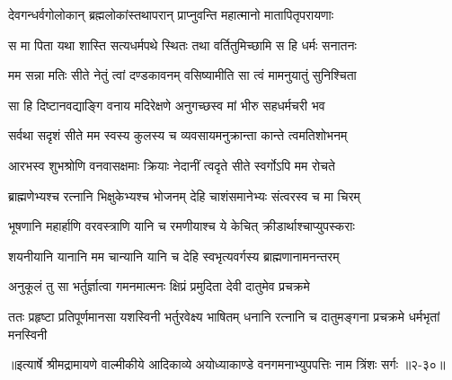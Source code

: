 \twolineshloka
{देवगन्धर्वगोलोकान् ब्रह्मलोकांस्तथापरान्}
{प्राप्नुवन्ति महात्मानो मातापितृपरायणाः} %

\twolineshloka
{स मा पिता यथा शास्ति सत्यधर्मपथे स्थितः}
{तथा वर्तितुमिच्छामि स हि धर्मः सनातनः} %

\twolineshloka
{मम सन्ना मतिः सीते नेतुं त्वां दण्डकावनम्}
{वसिष्यामीति सा त्वं मामनुयातुं सुनिश्चिता} %

\twolineshloka
{सा हि दिष्टानवद्याङ्गि वनाय मदिरेक्षणे}
{अनुगच्छस्व मां भीरु सहधर्मचरी भव} %

\twolineshloka
{सर्वथा सदृशं सीते मम स्वस्य कुलस्य च}
{व्यवसायमनुक्रान्ता कान्ते त्वमतिशोभनम्} %

\twolineshloka
{आरभस्व शुभश्रोणि वनवासक्षमाः क्रियाः}
{नेदानीं त्वदृते सीते स्वर्गोऽपि मम रोचते} %

\twolineshloka
{ब्राह्मणेभ्यश्च रत्नानि भिक्षुकेभ्यश्च भोजनम्}
{देहि चाशंसमानेभ्यः संत्वरस्व च मा चिरम्} %

\twolineshloka
{भूषणानि महार्हाणि वरवस्त्राणि यानि च}
{रमणीयाश्च ये केचित् क्रीडार्थाश्चाप्युपस्कराः} %

\twolineshloka
{शयनीयानि यानानि मम चान्यानि यानि च}
{देहि स्वभृत्यवर्गस्य ब्राह्मणानामनन्तरम्} %

\twolineshloka
{अनुकूलं तु सा भर्तुर्ज्ञात्वा गमनमात्मनः}
{क्षिप्रं प्रमुदिता देवी दातुमेव प्रचक्रमे} %

\twolineshloka
{ततः प्रहृष्टा प्रतिपूर्णमानसा यशस्विनी भर्तुरवेक्ष्य भाषितम्}
{धनानि रत्नानि च दातुमङ्गना प्रचक्रमे धर्मभृतां मनस्विनी} %


॥इत्यार्षे श्रीमद्रामायणे वाल्मीकीये आदिकाव्ये अयोध्याकाण्डे वनगमनाभ्युपपत्तिः नाम त्रिंशः सर्गः ॥२-३०॥
